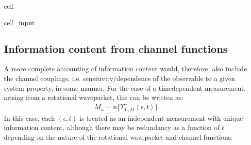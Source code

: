 \documentclass[letterpaper,table,10pt,english]{jupyterBook}
\begin{document}
\begin{sphinxuseclass}{cell}\begin{sphinxVerbatimInput}

\begin{sphinxuseclass}{cell_input}
\begin{sphinxVerbatim}[commandchars=\\\{\}]

  
  


\end{sphinxVerbatim}

\end{sphinxuseclass}\end{sphinxVerbatimInput}

\end{sphinxuseclass}

\subsection{Information content from channel functions}
\label{\detokenize{part1/theory_info_content_221122:information-content-from-channel-functions}}
\sphinxAtStartPar
A more complete accounting of information content would, therefore, also
include the channel couplings, i.e. sensitivity/dependence of the
observable to a given system property, in some manner. For the case of a
time\sphinxhyphen{}dependent measurement, arising from a rotational wavepacket, this
can be written as:
\begin{equation*}
\begin{split}M_{u}=\mathrm{n}\{\varUpsilon_{L,M}^{u}(\epsilon,t)\}\end{split}
\end{equation*}
\sphinxAtStartPar
In this case, each \((\epsilon,t)\) is treated as an independent
measurement with unique information content, although there may be
redundancy as a function of \(t\) depending on the nature of the
rotational wavepacket and channel functions.
\end{document}
